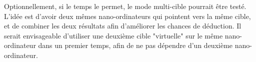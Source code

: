 \par Optionnellement, si le temps le permet, le mode multi-cible pourrait être testé. L'idée est d'avoir deux mêmes nano-ordinateurs qui pointent vers la même cible, et de combiner les deux résultats afin d'améliorer les chances de déduction. Il serait envisageable d'utiliser une deuxième cible "virtuelle" sur le même nano-ordinateur dans un premier temps, afin de ne pas dépendre d'un deuxième nano-ordinateur. 
